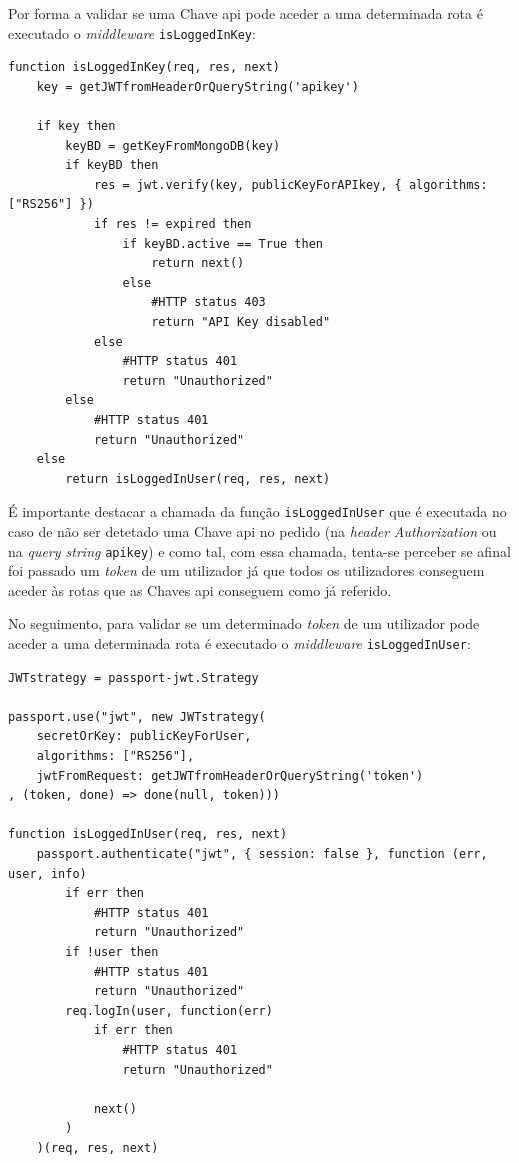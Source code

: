 Por forma a validar se uma Chave \acrshort{api} pode aceder a uma determinada rota é executado o \textit{middleware} \texttt{isLoggedInKey}:
\begin{lstlisting}[language=pseudocode, caption=Verificação se um pedido com uma determinada Chave \acrshort{api} pode ser efetuado]
function isLoggedInKey(req, res, next)
    key = getJWTfromHeaderOrQueryString('apikey')

    if key then
        keyBD = getKeyFromMongoDB(key)
        if keyBD then
            res = jwt.verify(key, publicKeyForAPIkey, { algorithms: ["RS256"] })
            if res != expired then
                if keyBD.active == True then
                    return next()
                else
                    #HTTP status 403
                    return "API Key disabled"
            else
                #HTTP status 401
                return "Unauthorized"
        else
            #HTTP status 401
            return "Unauthorized"
    else
        return isLoggedInUser(req, res, next)
\end{lstlisting}
É importante destacar a chamada da função \texttt{isLoggedInUser} que é executada no caso de não ser detetado uma Chave \acrshort{api} no pedido (na \textit{header} \textit{Authorization} ou na \textit{query string} \texttt{apikey}) e como tal, com essa chamada, tenta-se perceber se afinal foi passado um \textit{token} de um utilizador já que todos os utilizadores conseguem aceder às rotas que as Chaves \acrshort{api} conseguem como já referido.

No seguimento, para validar se um determinado \textit{token} de um utilizador pode aceder a uma determinada rota é executado o \textit{middleware} \texttt{isLoggedInUser}:
\begin{lstlisting}[language=pseudocode, caption=Verificação se um pedido com um determinado \textit{token} de um utilizador registado pode ser efetuado]
JWTstrategy = passport-jwt.Strategy

passport.use("jwt", new JWTstrategy(
    secretOrKey: publicKeyForUser,
    algorithms: ["RS256"],
    jwtFromRequest: getJWTfromHeaderOrQueryString('token')
, (token, done) => done(null, token)))

function isLoggedInUser(req, res, next)
    passport.authenticate("jwt", { session: false }, function (err, user, info)
        if err then
            #HTTP status 401
            return "Unauthorized"
        if !user then
            #HTTP status 401
            return "Unauthorized"
        req.logIn(user, function(err)
            if err then
                #HTTP status 401
                return "Unauthorized"

            next()
        )
    )(req, res, next)
\end{lstlisting}

